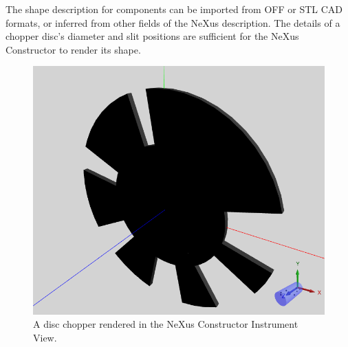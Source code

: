 The shape description for components can be imported from OFF or STL CAD formats, or inferred from other fields of the NeXus description.
The details of a chopper disc's diameter and slit positions are sufficient for the NeXus Constructor to render its shape.

\begin{figure}
	\includegraphics[width=0.6\linewidth]{chopperinstrumentview.png}
	\caption{A disc chopper rendered in the NeXus Constructor Instrument View.}
\end{figure}
